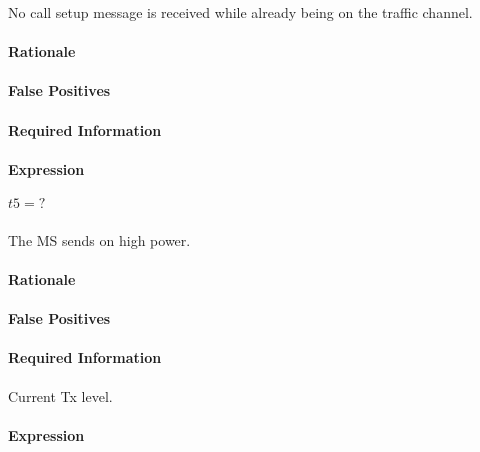 \documentclass[a4paper,11pt,notitlepage,bigheadings,oneside]{scrartcl}
\begin{document}
No call setup message is received while already being on the traffic channel.

\paragraph{Rationale}


\paragraph{False Positives}


\paragraph{Required Information}


\paragraph{Expression}

$t5 = ?$

\subsubsection{}

The MS sends on high power.

\paragraph{Rationale}


\paragraph{False Positives}


\paragraph{Required Information}

Current Tx level.

\paragraph{Expression}
\end{document}

